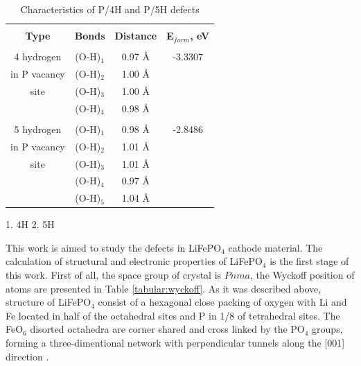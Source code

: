 


\begin{table}[h]
\caption{Characteristics of P/4H and P/5H defects}
\label{tabular:4or5H}
\begin{center}
\begin{tabular}{|c|c|c|c|}
\hline
& & & \\
\textbf{Type} & \textbf{Bonds} & \textbf{Distance} & \textbf{E$_{form}$, eV} \\
\hline
& & & \\
4 hydrogen & (O-H)$_{1}$ &  0.97 \AA &  -3.3307 \\ 
in P vacancy & (O-H)$_{2}$ & 1.00 \AA & \\
site  & (O-H)$_{3}$ & 1.00 \AA & \\
& (O-H)$_{4}$ & 0.98 \AA &\\
\hline
& & & \\
5 hydrogen & (O-H)$_{1}$ &  0.98 \AA &  -2.8486 \\ 
in P vacancy & (O-H)$_{2}$ & 1.01 \AA & \\
site  & (O-H)$_{3}$ & 1.01 \AA & \\
& (O-H)$_{4}$ & 0.97 \AA & \\
& (O-H)$_{5}$ & 1.04 \AA & \\
\hline
\end{tabular}
\end{center}
\end{table}

1. 4H
2. 5H 

\clearpage

This work is aimed to study the defects in LiFePO$_4$ cathode material. The calculation of structural and electronic properties of LiFePO$_4$ is the first stage of this work. First of all, the space group of crystal is $Pnma$, the Wyckoff position of atoms are presented in Table \ref{tabular:wyckoff}.  As it was described above, structure of LiFePO$_4$ consist of a hexagonal close packing of oxygen with Li and Fe located in half of the octahedral sites and P in 1/8 of tetrahedral sites. The FeO$_6$ disorted octahedra are corner shared and cross linked by the PO$_4$ groups, forming a three-dimentional network with perpendicular tunnels along the [001] direction \cite{morgan}. 

